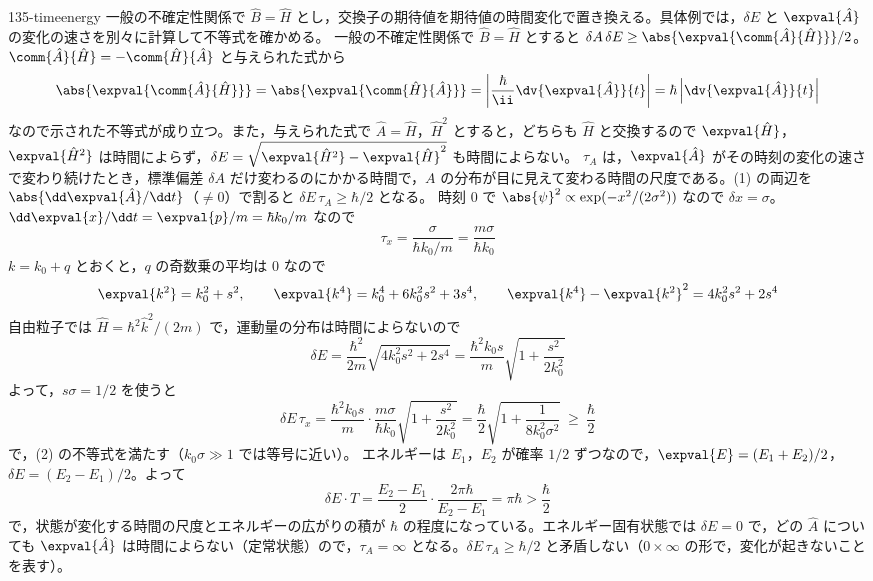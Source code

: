 \documentclass[uplatex,dvipdfmx,a4paper,11pt]{jsarticle}
\begin{document}
\begin{kaisetsu}{135-timeenergy}
\houshin 一般の不確定性関係で $\hat{B}=\hat{H}$ とし，交換子の期待値を期待値の時間変化で置き換える。具体例では，$\delta E$ と $\expval{\hat{A}}$ の変化の速さを別々に計算して不等式を確かめる。
\keisan
{} 一般の不確定性関係で $\hat{B}=\hat{H}$ とすると $\delta A\,\delta E\ge\abs{\expval{\comm{\hat{A}}{\hat{H}}}}/2$。$\comm{\hat{A}}{\hat{H}}=-\comm{\hat{H}}{\hat{A}}$ と与えられた式から
\[ \abs{\expval{\comm{\hat{A}}{\hat{H}}}}=\abs{\expval{\comm{\hat{H}}{\hat{A}}}}=\left|\frac{\hbar}{\ii}\dv{\expval{\hat{A}}}{t}\right|=\hbar\left|\dv{\expval{\hat{A}}}{t}\right| \]
なので示された不等式が成り立つ。また，与えられた式で $\hat{A}=\hat{H}$，$\hat{H}^{2}$ とすると，どちらも $\hat{H}$ と交換するので $\expval{\hat{H}}$，$\expval{\hat{H}^{2}}$ は時間によらず，$\delta E=\sqrt{\expval{\hat{H}^{2}}-\expval{\hat{H}}^{2}}$ も時間によらない。
 $\tau_{A}$ は，$\expval{\hat{A}}$ がその時刻の変化の速さで変わり続けたとき，標準偏差 $\delta A$ だけ変わるのにかかる時間で，$A$ の分布が目に見えて変わる時間の尺度である。(1) の両辺を $\abs{\dd\expval{\hat{A}}/\dd t}$（$\neq0$）で割ると $\delta E\,\tau_{A}\ge\hbar/2$ となる。
 時刻 $0$ で $\abs{\psi}^{2}\propto\exp(-x^{2}/(2\sigma^{2}))$ なので $\delta x=\sigma$。$\dd\expval{x}/\dd t=\expval{p}/m=\hbar k_{0}/m$ なので
\[ \tau_{x}=\frac{\sigma}{\hbar k_{0}/m}=\frac{m\sigma}{\hbar k_{0}} \]
$k=k_{0}+q$ とおくと，$q$ の奇数乗の平均は $0$ なので
\[ \expval{k^{2}}=k_{0}^{2}+s^{2},\qquad \expval{k^{4}}=k_{0}^{4}+6k_{0}^{2}s^{2}+3s^{4},\qquad \expval{k^{4}}-\expval{k^{2}}^{2}=4k_{0}^{2}s^{2}+2s^{4} \]
自由粒子では $\hat{H}=\hbar^{2}\hat{k}^{2}/(2m)$ で，運動量の分布は時間によらないので
\[ \delta E=\frac{\hbar^{2}}{2m}\sqrt{4k_{0}^{2}s^{2}+2s^{4}}=\frac{\hbar^{2}k_{0}s}{m}\sqrt{1+\frac{s^{2}}{2k_{0}^{2}}} \]
よって，$s\sigma=1/2$ を使うと
\[ \delta E\,\tau_{x}=\frac{\hbar^{2}k_{0}s}{m}\cdot\frac{m\sigma}{\hbar k_{0}}\sqrt{1+\frac{s^{2}}{2k_{0}^{2}}}=\frac{\hbar}{2}\sqrt{1+\frac{1}{8k_{0}^{2}\sigma^{2}}}\ \ge\ \frac{\hbar}{2} \]
で，(2) の不等式を満たす（$k_{0}\sigma\gg1$ では等号に近い）。
 エネルギーは $E_{1}$，$E_{2}$ が確率 $1/2$ ずつなので，$\expval{E}=(E_{1}+E_{2})/2$，$\delta E=(E_{2}-E_{1})/2$。よって
\[ \delta E\cdot T=\frac{E_{2}-E_{1}}{2}\cdot\frac{2\pi\hbar}{E_{2}-E_{1}}=\pi\hbar>\frac{\hbar}{2} \]
で，状態が変化する時間の尺度とエネルギーの広がりの積が $\hbar$ の程度になっている。エネルギー固有状態では $\delta E=0$ で，どの $\hat{A}$ についても $\expval{\hat{A}}$ は時間によらない（定常状態）ので，$\tau_{A}=\infty$ となる。$\delta E\,\tau_{A}\ge\hbar/2$ と矛盾しない（$0\times\infty$ の形で，変化が起きないことを表す）。

\end{kaisetsu}
\end{document}
